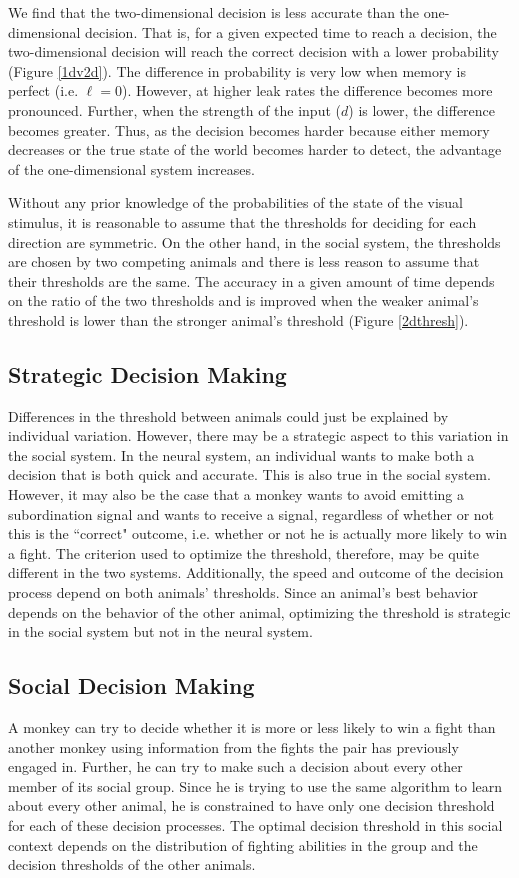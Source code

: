 \documentclass{article}
\begin{document}
We find that the two-dimensional decision is less accurate than the one-dimensional decision.  That is, for a given expected time to reach a decision, the two-dimensional decision will reach the correct decision with a lower probability (Figure \ref{1dv2d}).  The difference in probability is very low when memory is perfect (i.e. $\ell=0$).  However, at higher leak rates the difference becomes more pronounced.  Further, when the strength of the input ($d$) is lower, the difference becomes greater.  Thus, as the decision becomes harder because either memory decreases or the true state of the world becomes harder to detect, the advantage of the one-dimensional system increases.

Without any prior knowledge of the probabilities of the state of the visual stimulus, it is reasonable to assume that the thresholds for deciding for each direction are symmetric.  On the other hand, in the social system, the thresholds are chosen by two competing animals and there is less reason to assume that their thresholds are the same.  The accuracy in a given amount of time depends on the ratio of the two thresholds and is improved when the weaker animal's threshold is lower than the stronger animal's threshold (Figure \ref{2dthresh}).  

\subsection{Strategic Decision Making }
Differences in the threshold between animals could just be explained by individual variation.  However, there may be a strategic aspect to this variation in the social system.  In the neural system, an individual wants to make both a decision that is both quick and accurate.  This is also true in the social system.  However, it may also be the case that a monkey wants to avoid emitting a subordination signal and wants to receive a signal, regardless of whether or not this is the ``correct" outcome, i.e. whether or not he is actually more likely to win a fight.  The criterion used to optimize the threshold, therefore, may be quite different in the two systems.  Additionally, the speed and outcome of the decision process depend on both animals' thresholds.  Since an animal's best behavior depends on the behavior of the other animal, optimizing the threshold is strategic in the social system but not in the neural system.  

\subsection{Social Decision Making }
A monkey can try to decide whether it is more or less likely to win a fight than another monkey using information from the fights the pair has previously engaged in.  Further, he can try to make such a decision about every other member of its social group.  Since he is trying to use the same algorithm to learn about every other animal, he is constrained to have only one decision threshold for each of these decision processes.  The optimal decision threshold in this social context depends on the distribution of fighting abilities in the group and the decision thresholds of the other animals. 
\end{document}
